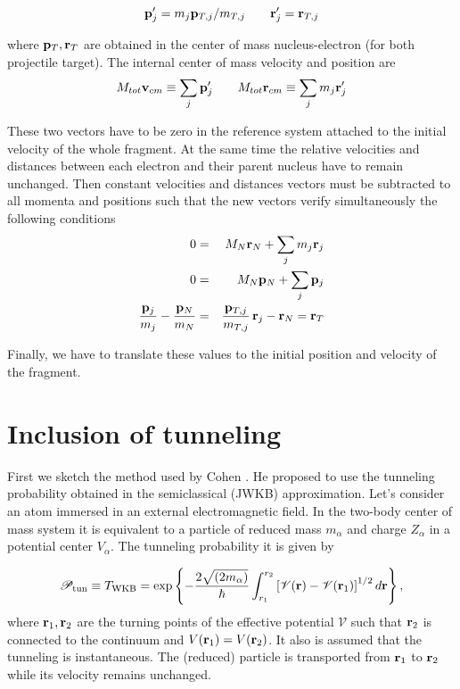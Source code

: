 \[
\mathbf{p}'_{j} = m_{j} \mathbf{p}_{T,j}/m_{T,j} \qquad \mathbf{r}'_{j} =
\mathbf{r}_{T,j}
\]

where $\mathbf{p}_{T}, \mathbf{r}_{T}$ are obtained in the center of mass
nucleus-electron (for both projectile target). The internal center of
mass velocity and position are
%
\[
M_{tot} \mathbf{v}_{cm} \equiv \sum_{j} \mathbf{p}'_{j}  \qquad M_{tot}
\mathbf{r}_{cm} \equiv \sum_{j} m_{j} \mathbf{r}'_{j}
\]

These two vectors have to be zero in the reference system attached to
the initial velocity of the whole fragment. At the same time the
relative velocities and distances between each electron and their
parent nucleus have to remain unchanged. Then constant velocities and
distances vectors must be subtracted to all momenta and positions such
that the new vectors verify simultaneously the following conditions
\begin{eqnarray*}
  0 &=& M_{N} \mathbf{r}_{N} + \sum_{j} m_{j} \mathbf{r}_{j} \\
  0 &=& M_{N} \mathbf{p}_{N} + \sum_{j} \mathbf{p}_{j} \\
\frac{\mathbf{p}_{j}}{m_{j}} - \frac{\mathbf{p}_{N}}{m_{N}} &=&
\frac{\mathbf{p}_{T,j}}{m_{T,j}}\, \mathbf{r}_{j}-\mathbf{r}_{N} = \mathbf{r}_{T}
\end{eqnarray*}

Finally, we have to translate these values to the initial position and
velocity of the fragment.

\section{Inclusion of tunneling}
\label{S:Inclu-tunne}

First we sketch the method used by Cohen \autocite{Cohen2001PRAp043412}. He proposed
to use the tunneling probability obtained in the semiclassical (JWKB)
approximation. Let's consider an atom immersed in an external
electromagnetic field. In the two-body center of mass system it is
equivalent to a particle of reduced mass $m_{\alpha}$ and charge
$Z_{\alpha}$ in a potential center $V_{\alpha}$. The tunneling
probability it is given by \cite{Galindo1990_QMvII}

\begin{equation}\label{Q:proba-tunne-JWKB}
\mathcal{P}_{\mathrm{tun}} \equiv T_{\mathrm{WKB}} = \exp{\left\{ -
\frac{2 \sqrt{(2 m_{\alpha})}}{\hbar} \int_{r_{1}}^{r_{2}} \left[
\mathcal{V}(\mathbf{r}) - \mathcal{V}(\mathbf{r}_{1})\right]^{1/2} d \mathbf{r}
\right\}} \, ,
\end{equation}
%
where $\mathbf{r}_{1}, \mathbf{r}_{2}$ are the turning points of the effective
potential $\mathcal{V}$ such that $\mathbf{r}_{2}$ is connected to the
continuum and $V(\mathbf{r}_{1})=V(\mathbf{r}_{2})$. It also is assumed that
the tunneling is instantaneous. The (reduced) particle is transported
from $\mathbf{r}_{1}$ to $\mathbf{r}_{2}$ while its velocity remains unchanged.

